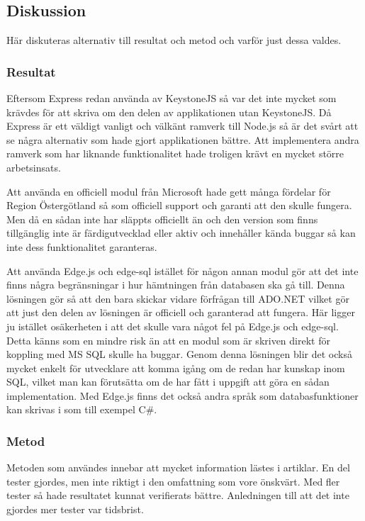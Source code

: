 \subsection{Diskussion}
Här diskuteras alternativ till resultat och metod och varför just dessa valdes.
\subsubsection{Resultat}
Eftersom Express redan använda av KeystoneJS så var det inte mycket som krävdes för att skriva om den delen av applikationen utan KeystoneJS. Då Express är ett väldigt vanligt och välkänt ramverk till Node.js så är det svårt att se några alternativ som hade gjort applikationen bättre. Att implementera andra ramverk som har liknande funktionalitet hade troligen krävt en mycket större arbetsinsats. 

Att använda en officiell modul från Microsoft hade gett många fördelar för Region Östergötland så som officiell support och garanti att den skulle fungera. Men då en sådan inte har släppts officiellt än och den version som finns tillgänglig inte är färdigutvecklad eller aktiv \cite{sqlGit} och innehåller kända buggar \cite{sqlBugs} så kan inte dess funktionalitet garanteras. 

Att använda Edge.js och edge-sql istället för någon annan modul gör att det inte finns några begränsningar i hur hämtningen från databasen ska gå till. Denna lösningen gör så att den bara skickar vidare förfrågan till ADO.NET vilket gör att just den delen av lösningen är officiell och garanterad att fungera. Här ligger ju istället osäkerheten i att det skulle vara något fel på Edge.js och edge-sql. Detta känns som en mindre risk än att en modul som är skriven direkt för koppling med MS SQL skulle ha buggar.
Genom denna lösningen blir det också mycket enkelt för utvecklare att komma igång om de redan har kunskap inom SQL, vilket man kan förutsätta om de har fått i uppgift att göra en sådan implementation. Med Edge.js finns det också andra språk som databasfunktioner kan skrivas i som till exempel C\#. 

\subsubsection{Metod}
Metoden som användes innebar att mycket information lästes i artiklar. En del tester gjordes, men inte riktigt i den omfattning som vore önskvärt. Med fler tester så hade resultatet kunnat verifierats bättre. Anledningen till att det inte gjordes mer tester var tidsbrist.

